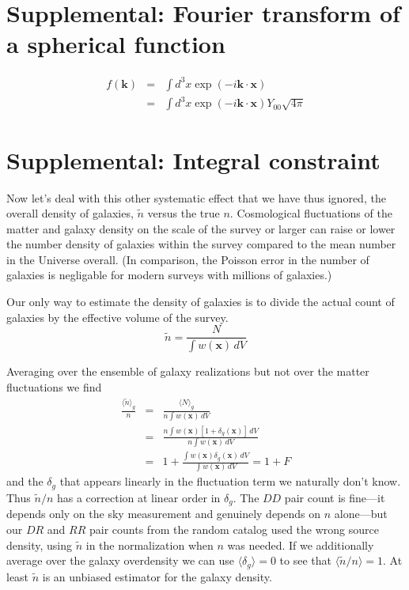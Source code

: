 \begin{subappendices}

\section{Supplemental: Fourier transform of a spherical function}
\begin{eqnarray}
  f(\mathbf{k}) &=& \int d^3x \exp(- i \mathbf{k \cdot x}) \\
  &=& \int d^3x \exp(- i \mathbf{k \cdot x}) Y_{00} \sqrt{4\pi}
\end{eqnarray}


\section{Supplemental: Integral constraint}
Now let's deal with this other systematic effect that we have thus ignored,  the overall density of galaxies, $\tilde n$ versus the true $n$. Cosmological fluctuations of the matter and galaxy density on the scale of the survey or larger can raise or lower the number density of galaxies within the survey compared to the mean number in the Universe overall.  (In comparison, the Poisson error in the number of galaxies is negligable for modern surveys with millions of galaxies.)

Our only way to estimate the density of galaxies is to divide the actual count of galaxies by the effective volume of the survey. 
\begin{equation}
\tilde n = \frac{N}{\int w(\mathbf x) \, dV }
\end{equation}

Averaging over the ensemble of galaxy realizations but not over the matter fluctuations we find
\begin{eqnarray}
  \frac{\langle \tilde n \rangle_{g}}{n} &=& \frac{\langle N \rangle_{g}}{n \int w(\mathbf x) \, dV }  \\
  &=&  \frac{n \int w(\mathbf x)[1+\delta_g(\mathbf x)] \, dV}{n \int w(\mathbf x) \, dV } \\
  &=&  1 +   \frac{ \int w(\mathbf x)\delta_g(\mathbf x) \, dV}{ \int w(\mathbf x) \, dV } = 1+F
\end{eqnarray}
and the $\delta_g$ that appears linearly in the fluctuation term we naturally don't know.  Thus $\tilde n / n$ has a correction at linear order in $\delta_g$.
The $DD$ pair count is fine---it depends only on the sky measurement and genuinely depends on $n$ alone---but our $DR$ and $RR$ pair counts from the random catalog used the wrong source density, using $\tilde n$ in the normalization when $n$ was needed.  If we additionally average over the galaxy overdensity we can use $\langle \delta_g \rangle = 0$ to see that $\langle \tilde n / n  \rangle = 1$. At least $\tilde n$ is an unbiased estimator for the galaxy density.


\end{subappendices}
